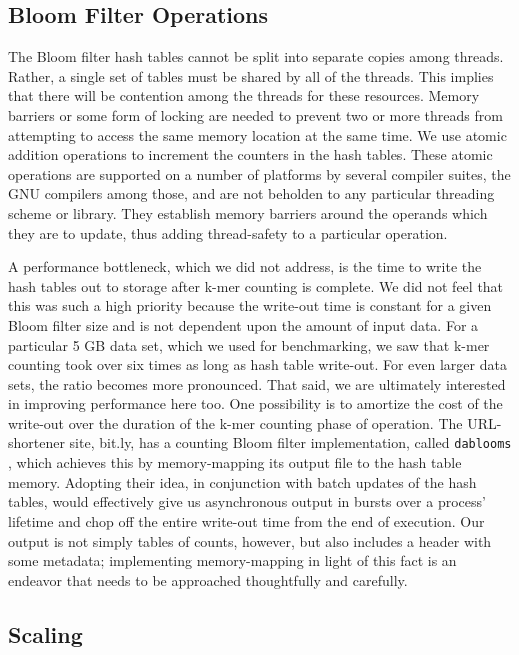 \documentclass{article}
\begin{document}
\subsection{Bloom Filter Operations}

The Bloom filter hash tables cannot be split into separate copies among
threads. Rather, a single set of tables must be shared by all of the threads.
This implies that there will be contention among the threads for these
resources. Memory barriers \citep{web:membar} or some form of locking are
needed to prevent two or more threads from attempting to access the same memory
location at the same time. We use atomic addition operations to increment the
counters in the hash tables. These atomic operations \citep{web:atomics} are
supported on a number of platforms by several compiler suites, the GNU
compilers among those, and are not beholden to any particular threading scheme
or library. They establish memory barriers around the operands which they are
to update, thus adding thread-safety to a particular operation.

A performance bottleneck, which we did not address, is the time to write the
hash tables out to storage after k-mer counting is complete. We did not feel
that this was such a high priority because the write-out time is constant for a
given Bloom filter size and is not dependent upon the amount of input data.
For a particular 5 GB data set, which we used for benchmarking, we saw that
k-mer counting took over six times as long as hash table write-out. For even
larger data sets, the ratio becomes more pronounced. That said, we are
ultimately interested in improving performance here too. One possibility is to
amortize the cost of the write-out over the duration of the k-mer counting
phase of operation. The URL-shortener site, bit.ly, has a counting Bloom filter
implementation, called \texttt{dablooms} \citep{web:dablooms}, which achieves
this by memory-mapping its output file to the hash table memory.  Adopting
their idea, in conjunction with batch updates of the hash tables, would
effectively give us asynchronous output in bursts over a process' lifetime and
chop off the entire write-out time from the end of execution. Our output is not
simply tables of counts, however, but also includes a header with some
metadata; implementing memory-mapping in light of this fact is an endeavor that
needs to be approached thoughtfully and carefully.

\subsection{Scaling}
\end{document}
